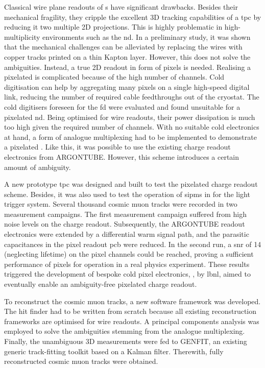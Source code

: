 Classical wire plane readouts of \lartpc{}s have significant drawbacks.
Besides their mechanical fragility, they cripple the excellent 3D tracking capabilities of a \gls{tpc} by reducing it two multiple 2D projections.
This is highly problematic in high-multiplicity environments such as the \dune{} \gls{nd}.
In a preliminary study, it was shown that the mechanical challenges can be alleviated by replacing the wires with copper tracks printed on a thin Kapton layer.
However, this does not solve the ambiguities.
Instead, a true 2D readout in form of pixels is needed.
Realising a pixelated \lartpc{} is complicated because of the high number of channels.
Cold digitisation can help by aggregating many pixels on a single high-speed digital link, reducing the number of required cable feedthroughs out of the cryostat.
The cold digitisers foreseen for the \dune{} \gls{fd} were evaluated and found unsuitable for a pixelated \gls{nd}.
Being optimised for wire readouts, their power dissipation is much too high given the required number of channels.
With no suitable cold electronics at hand, a form of analogue multiplexing had to be implemented to demonstrate a pixelated \lartpc{}.
Like this, it was possible to use the existing charge readout electronics from ARGONTUBE.
However, this scheme introduces a certain amount of ambiguity.

A new prototype \gls{tpc} was designed and built to test the pixelated charge readout scheme.
Besides, it was also used to test the operation of \glspl{sipm} in \lar{} for the light trigger system.
Several thousand cosmic muon tracks were recorded in two measurement campaigns.
The first measurement campaign suffered from high noise levels on the charge readout.
Subsequently, the ARGONTUBE readout electronics were extended by a differential warm signal path, and the parasitic capacitances in the pixel readout \gls{pcb} were reduced.
In the second run, a \gls{snr} of \num{14} (neglecting lifetime) on the pixel channels could be reached, proving a sufficient performance of pixels for operation in a real physics experiment.
These results triggered the development of bespoke cold pixel electronics, \larpix{}, by \gls{lbnl}, aimed to eventually enable an ambiguity-free pixelated \lartpc{} charge readout.

To reconstruct the cosmic muon tracks, a new software framework was developed.
The hit finder had to be written from scratch because all existing \lartpc{} reconstruction frameworks are optimised for wire readouts.
A principal components analysis was employed to solve the ambiguities stemming from the analogue multiplexing.
Finally, the unambiguous 3D measurements were fed to GENFIT, an existing generic track-fitting toolkit based on a Kalman filter.
Therewith, fully reconstructed cosmic muon tracks were obtained.

